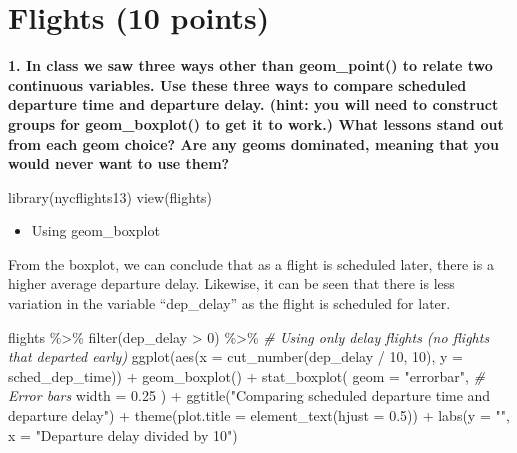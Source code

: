 \documentclass[
]{article}
\newenvironment{Shaded}{\begin{snugshade}}{\end{snugshade}}
\newcommand{\AttributeTok}[1]{\textcolor[rgb]{0.77,0.63,0.00}{#1}}
\newcommand{\CommentTok}[1]{\textcolor[rgb]{0.56,0.35,0.01}{\textit{#1}}}
\newcommand{\DecValTok}[1]{\textcolor[rgb]{0.00,0.00,0.81}{#1}}
\newcommand{\FloatTok}[1]{\textcolor[rgb]{0.00,0.00,0.81}{#1}}
\newcommand{\FunctionTok}[1]{\textcolor[rgb]{0.00,0.00,0.00}{#1}}
\newcommand{\NormalTok}[1]{#1}
\newcommand{\SpecialCharTok}[1]{\textcolor[rgb]{0.00,0.00,0.00}{#1}}
\newcommand{\StringTok}[1]{\textcolor[rgb]{0.31,0.60,0.02}{#1}}
\providecommand{\tightlist}{%
  \setlength{\itemsep}{0pt}\setlength{\parskip}{0pt}}
\begin{document}
\pagebreak

\hypertarget{flights-10-points}{%
\section{Flights (10 points)}\label{flights-10-points}}

\textbf{1. In class we saw three ways other than geom\_point() to relate
two continuous variables. Use these three ways to compare scheduled
departure time and departure delay. (hint: you will need to construct
groups for geom\_boxplot() to get it to work.) What lessons stand out
from each geom choice? Are any geoms dominated, meaning that you would
never want to use them?}

\begin{Shaded}
\begin{Highlighting}[]
\FunctionTok{library}\NormalTok{(nycflights13)}
\FunctionTok{view}\NormalTok{(flights)}
\end{Highlighting}
\end{Shaded}

\begin{itemize}
\tightlist
\item
  Using geom\_boxplot
\end{itemize}

From the boxplot, we can conclude that as a flight is scheduled later,
there is a higher average departure delay. Likewise, it can be seen that
there is less variation in the variable ``dep\_delay'' as the flight is
scheduled for later.

\begin{Shaded}
\begin{Highlighting}[]
\NormalTok{flights }\SpecialCharTok{\%\textgreater{}\%}
  \FunctionTok{filter}\NormalTok{(dep\_delay }\SpecialCharTok{\textgreater{}} \DecValTok{0}\NormalTok{) }\SpecialCharTok{\%\textgreater{}\%} \CommentTok{\# Using only delay flights (no flights that departed early)}
  \FunctionTok{ggplot}\NormalTok{(}\FunctionTok{aes}\NormalTok{(}\AttributeTok{x =} \FunctionTok{cut\_number}\NormalTok{(dep\_delay }\SpecialCharTok{/} \DecValTok{10}\NormalTok{, }\DecValTok{10}\NormalTok{), }\AttributeTok{y =}\NormalTok{ sched\_dep\_time)) }\SpecialCharTok{+}
  \FunctionTok{geom\_boxplot}\NormalTok{() }\SpecialCharTok{+}
  \FunctionTok{stat\_boxplot}\NormalTok{(}
    \AttributeTok{geom =} \StringTok{"errorbar"}\NormalTok{, }\CommentTok{\# Error bars}
    \AttributeTok{width =} \FloatTok{0.25}
\NormalTok{  ) }\SpecialCharTok{+}
  \FunctionTok{ggtitle}\NormalTok{(}\StringTok{"Comparing scheduled departure time and departure delay"}\NormalTok{) }\SpecialCharTok{+}
  \FunctionTok{theme}\NormalTok{(}\AttributeTok{plot.title =} \FunctionTok{element\_text}\NormalTok{(}\AttributeTok{hjust =} \FloatTok{0.5}\NormalTok{)) }\SpecialCharTok{+}
  \FunctionTok{labs}\NormalTok{(}\AttributeTok{y =} \StringTok{""}\NormalTok{, }\AttributeTok{x =} \StringTok{"Departure delay divided by 10"}\NormalTok{)}
\end{Highlighting}
\end{Shaded}
\end{document}
